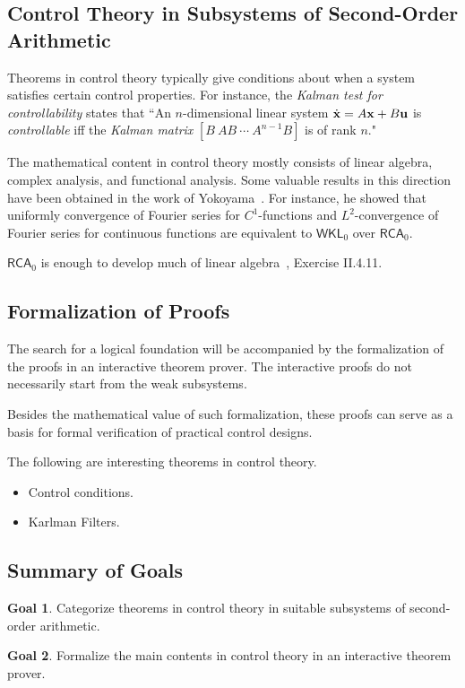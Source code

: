 \documentclass[10pt]{article}
\theoremstyle{definition}
\newtheorem{goal}{Goal}
\begin{document}
\subsection{Control Theory in Subsystems of Second-Order Arithmetic} 

Theorems in control theory typically give conditions about when a system satisfies certain control properties. For instance, the {\em Kalman test for controllability} states that ``An $n$-dimensional linear system $\dot {\bf x} = A{\bf x}+B{\bf u}$ is {\em controllable} iff the {\em Kalman matrix}
$[B\ AB\ \cdots\ A^{n-1}B]$ is of rank $n$." 

The mathematical content in control theory mostly consists of linear algebra, complex analysis, and functional analysis. Some valuable results in this direction have been obtained in the work of Yokoyama~\cite{yoko}. For instance, he showed that uniformly convergence of Fourier series for $C^1$-functions and $L^2$-convergence of Fourier series for continuous functions are equivalent to $\mathsf{WKL}_0$ over $\mathsf{RCA}_0$. 

$\mathsf{RCA}_0$ is enough to develop much of linear algebra~\cite{}, Exercise II.4.11. 

\subsection{Formalization of Proofs}

The search for a logical foundation will be accompanied by the formalization of the proofs in an interactive theorem prover. The interactive proofs do not necessarily start from the weak subsystems. 


Besides the mathematical value of such formalization, these proofs can serve as a basis for formal verification of practical control designs. 

The following are interesting theorems in control theory. 
\begin{itemize}
\item Control conditions. 
\item Karlman Filters. 
\end{itemize}

\subsection{Summary of Goals}

\begin{goal}
Categorize theorems in control theory in suitable subsystems of second-order arithmetic. 
\end{goal}
\begin{goal}
Formalize the main contents in control theory in an interactive theorem prover.  
\end{goal}
\end{document}
